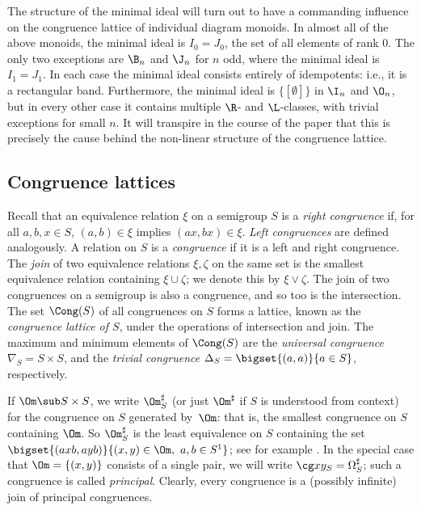 The structure of the minimal ideal will turn out to have a commanding influence on
the congruence lattice of individual diagram monoids.
In almost all of the above monoids, the minimal ideal is $I_0=J_0$, the set of all elements of rank $0$.
The only two exceptions are $\B_n$ and $\J_n$ for $n$ odd, where the minimal ideal is $I_1=J_1$.
In each case the minimal ideal consists entirely of idempotents: i.e., it is a rectangular band.
Furthermore, the minimal ideal is $\{[\emptyset]\}$ in $\I_n$ and
$\O_n$, but in every other case it contains multiple $\R$- and $\L$-classes, with trivial exceptions for small $n$.
It will transpire in the course of the paper that this is precisely the
cause behind the non-linear structure of the congruence lattice.






\subsection{Congruence lattices}\label{sec:prelim_congruences}


Recall that an equivalence relation $\xi$ on a semigroup $S$ is a \emph{right
congruence} if, for all $a,b,x\in S$, $(a,b)\in\xi$ implies $(ax,bx)\in\xi$.
\emph{Left congruences} are defined analogously.  A relation on $S$ is a
\emph{congruence} if it is a left and right congruence.  The \emph{join} of two
equivalence relations $\xi,\zeta$ on the same set is the smallest equivalence
relation containing $\xi\cup\zeta$; we denote this by $\xi\vee\zeta$.  The join
of two congruences on a semigroup is also a congruence, and so too is the
intersection.  The set $\Cong(S)$ of all congruences on $S$ forms a lattice,
known as the \emph{congruence lattice of $S$}, under the operations of
intersection and join.  The maximum and minimum elements of $\Cong(S)$ are
the \emph{universal congruence} ${\nabla_S=S\times S}$, and the \emph{trivial congruence} $\Delta_S=\bigset{(a,a)}{a\in S}$, respectively.


If $\Om\sub S\times S$, we write $\Om^\sharp_S$ (or just $\Om^\sharp$ if $S$ is
understood from context) for the congruence on $S$ generated by~$\Om$: that is,
the smallest congruence on $S$ containing $\Om$.  So $\Om^\sharp_S$ is the
least equivalence on $S$ containing the set $\bigset{(axb,ayb)}{(x,y)\in\Om,\
a,b\in S^1}$; see for example \cite[Section~1.5]{Howie}.  In the special case
that $\Om=\{(x,y)\}$ consists of a single pair, we will write $\cg
xy_S=\Omega^\sharp_S$; such a congruence is called \emph{principal}.
Clearly, every congruence is a (possibly infinite) join of principal congruences.

